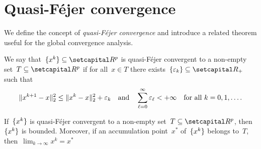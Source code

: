 \documentclass[../main]{subfiles}
\begin{document}
\section{Quasi-F\'ejer convergence} 
We define the concept of \emph{quasi-F\'ejer convergence} and introduce a related theorem useful for the global convergence analysis.
\begin{definition} 
    We say that~$\set{x^k} \subseteq \setR^p$ is quasi-F\'ejer convergent to a non-empty set~$T \subseteq \setR^p$ if for all~$x \in T$ there exists~$\set{\varepsilon_k} \subseteq \setRpos$ such that
    \begin{equation}
        \lVert x^{k + 1} - x\rVert_2^2 \le \lVert x^k - x\rVert_2^2 + \varepsilon_k \quad \text{and} \quad \sum_{\ell = 0}^{\infty} \varepsilon_\ell < + \infty \quad \text{for all~$k = 0, 1, \dots$}
    .\end{equation} 
\end{definition}

\begin{theorem} 
    If~$\lbrace x^k\rbrace$ is quasi-F\'ejer convergent to a non-empty set~$T \subseteq \setR^p$, then~$\lbrace x^k\rbrace$ is bounded.
    Moreover, if an accumulation point~$x^*$ of~$\lbrace x^k\rbrace$ belongs to~$T$, then~$\lim_{k \to \infty} x^k = x^*$
\end{theorem}
\end{document}
